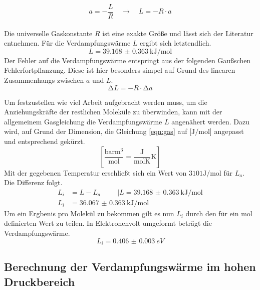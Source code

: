\begin{equation}
a = -\frac{L}{R} \quad \to \quad L = -R \cdot a
\end{equation}
\\
Die universelle Gaskonstante $R$ ist eine exakte Größe und lässt sich der Literatur \cite{Naturkonstanten} entnehmen.
Für die Verdampfungswärme $L$ ergibt sich letztendlich.
\begin{equation}
L = \SI{39.168(0363)}{\kilo\joule\per\mol}
\end{equation}
Der Fehler auf die Verdampfungswärme entspringt aus der folgenden Gaußschen Fehlerfortpflanzung. Diese ist hier besonders simpel auf Grund des linearen Zusammenhangs zwischen $a$ und $L$. 
\begin{equation}
\increment L = -R \cdot \increment a
\end{equation}

Um festzustellen wie viel Arbeit aufgebracht werden muss, um die Anziehungskräfte der restlichen Moleküle zu überwinden,
kann mit der allgemeinem Gasgleichung die Verdampfungswärme $L$ angenähert werden.
Dazu wird, auf Grund der Dimension, die Gleichung \eqref{eqn:gas} auf [$\si{\joule}/\si{\mol}$] angepasst und entsprechend gekürzt.
\begin{equation}
    \left[\frac{\si{\bar\meter\tothe{3}}}{\si{\mol}}=\frac{\si{\joule}}{\si{\mol\kelvin}}\si{\kelvin}\right]
\end{equation}
Mit der gegebenen Temperatur erschließt sich ein Wert von $3101\si{\joule\per\mol}$ für $L_a$. Die Differenz folgt.
\begin{align*}
    L_i&=L-L_a \hspace{1cm}  | L = \SI{39.168(0363)}{\kilo\joule\per\mol} \\
    L_i&= \SI{36.067(0363)}{\kilo\joule\per\mol}
\end{align*}
Um ein Ergbenis pro Molekül zu bekommen gilt es nun $L_i$ durch den für ein $\si{\mol}$ definierten Wert zu teilen.
In Elektronenvolt umgeformt beträgt die Verdampfungswärme.
\begin{equation}    
    L_i= \SI{0.406(0003)}{eV}
\end{equation}

\subsection{Berechnung der Verdampfungswärme im hohen Druckbereich}

